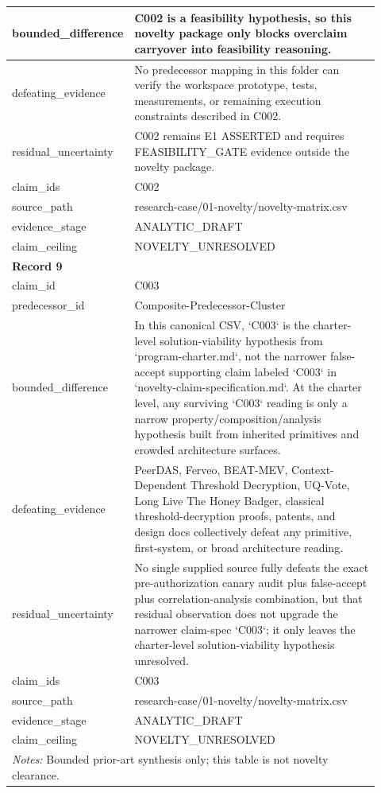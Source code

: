 \begin{longtable}{|p{0.24\linewidth}|p{0.68\linewidth}|}
bounded\_\allowbreak{}difference & C002 is a feasibility hypothesis, so this novelty package only blocks overclaim carryover into feasibility reasoning. \\ \hline
defeating\_\allowbreak{}evidence & No predecessor mapping in this folder can verify the workspace prototype, tests, measurements, or remaining execution constraints described in C002. \\ \hline
residual\_\allowbreak{}uncertainty & C002 remains E1 ASSERTED and requires FEASIBILITY\_\allowbreak{}GATE evidence outside the novelty package. \\ \hline
claim\_\allowbreak{}ids & C002 \\ \hline
source\_\allowbreak{}path & research-case/01-novelty/novelty-matrix.csv \\ \hline
evidence\_\allowbreak{}stage & ANALYTIC\_\allowbreak{}DRAFT \\ \hline
claim\_\allowbreak{}ceiling & NOVELTY\_\allowbreak{}UNRESOLVED \\ \hline
\multicolumn{2}{|l|}{\textbf{Record 9}} \\ \hline
claim\_\allowbreak{}id & C003 \\ \hline
predecessor\_\allowbreak{}id & Composite-Predecessor-Cluster \\ \hline
bounded\_\allowbreak{}difference & In this canonical CSV, `C003` is the charter-level solution-viability hypothesis from `program-charter.md`, not the narrower false-accept supporting claim labeled `C003` in `novelty-claim-specification.md`. At the charter level, any surviving `C003` reading is only a narrow property/composition/analysis hypothesis built from inherited primitives and crowded architecture surfaces. \\ \hline
defeating\_\allowbreak{}evidence & PeerDAS, Ferveo, BEAT-MEV, Context-Dependent Threshold Decryption, UQ-Vote, Long Live The Honey Badger, classical threshold-decryption proofs, patents, and design docs collectively defeat any primitive, first-system, or broad architecture reading. \\ \hline
residual\_\allowbreak{}uncertainty & No single supplied source fully defeats the exact pre-authorization canary audit plus false-accept plus correlation-analysis combination, but that residual observation does not upgrade the narrower claim-spec `C003`;\allowbreak{} it only leaves the charter-level solution-viability hypothesis unresolved. \\ \hline
claim\_\allowbreak{}ids & C003 \\ \hline
source\_\allowbreak{}path & research-case/01-novelty/novelty-matrix.csv \\ \hline
evidence\_\allowbreak{}stage & ANALYTIC\_\allowbreak{}DRAFT \\ \hline
claim\_\allowbreak{}ceiling & NOVELTY\_\allowbreak{}UNRESOLVED \\ \hline
\multicolumn{2}{|p{0.92\linewidth}|}{\textit{Notes:} Bounded prior-art synthesis only; this table is not novelty clearance.} \\ \hline
\end{longtable}
\endgroup

